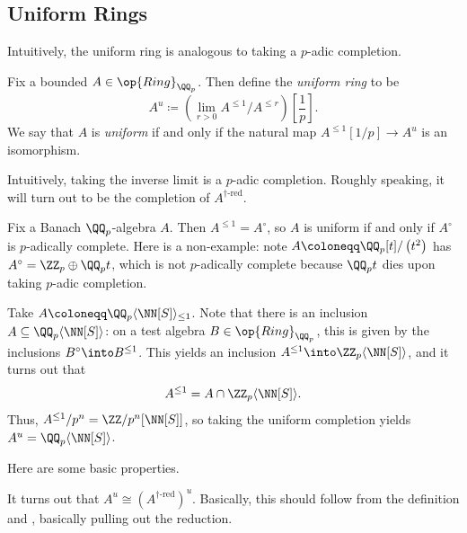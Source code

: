 \documentclass{article}
\begin{document}
\subsection{Uniform Rings}
Intuitively, the uniform ring is analogous to taking a $p$-adic completion.
\begin{definition}
	Fix a bounded $A\in\op{Ring}_{\QQ_p}$. Then define the \textit{uniform ring} to be
	\[A^u\coloneqq\left(\lim_{r>0}A^{\le1}/A^{\le r}\right)\left[\frac1p\right].\]
	We say that $A$ is \textit{uniform} if and only if the natural map $A^{\le1}[1/p]\to A^u$ is an isomorphism.
\end{definition}
\begin{remark}
	Intuitively, taking the inverse limit is a $p$-adic completion. Roughly speaking, it will turn out to be the completion of $A^{\dagger\textrm{-red}}$.
\end{remark}
\begin{example}
	Fix a Banach $\QQ_p$-algebra $A$. Then $A^{\le1}=A^\circ$, so $A$ is uniform if and only if $A^\circ$ is $p$-adically complete. Here is a non-example: note $A\coloneqq\QQ_p[t]/\left(t^2\right)$ has $A^\circ=\ZZ_p\oplus\QQ_pt$, which is not $p$-adically complete because $\QQ_pt$ dies upon taking $p$-adic completion.
\end{example}
\begin{example}
	Take $A\coloneqq\QQ_p\langle\NN[S]\rangle_{\le1}$. Note that there is an inclusion $A\subseteq\QQ_p\langle\NN[S]\rangle$: on a test algebra $B\in\op{Ring}_{\QQ_p}$, this is given by the inclusions $B^\circ\into B^{\le1}$. This yields an inclusion $A^{\le1}\into\ZZ_p\langle\NN[S]\rangle$, and it turns out that
	\[A^{\le1}=A\cap\ZZ_p\langle\NN[S]\rangle.\]
	Thus, $A^{\le1}/p^n=\ZZ/p^n[\NN[S]]$, so taking the uniform completion yields $A^u=\QQ_p\langle\NN[S]\rangle$.
\end{example}
Here are some basic properties.
\begin{remark}
	It turns out that $A^u\cong\left(A^{\dagger\textrm{-red}}\right)^u$. Basically, this should follow from the definition and , basically pulling out the reduction.
\end{remark}
\end{document}
